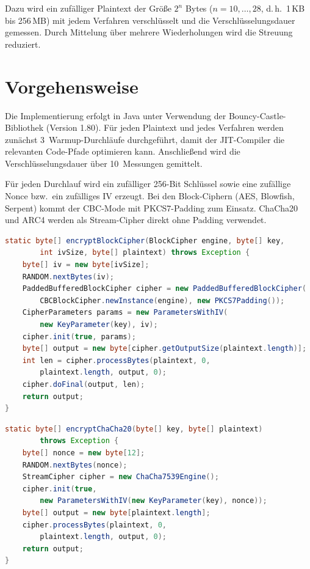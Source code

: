 \documentclass[
    fontsize=12pt,          %
    paper=a4,               %
    numbers=noenddot,       %
    listof=totoc,           %
    listof=entryprefix,     %
    listof=nochaptergap,    %
    bibliography=totoc,     %
    parskip=half,           %
    openany                 %
]{scrbook}
\begin{document}
Dazu wird ein zufälliger Plaintext der Größe $2^n$ Bytes ($n = 10, \ldots, 28$, d.\,h.\ 1\,KB bis 256\,MB) mit jedem Verfahren verschlüsselt und die Verschlüsselungsdauer gemessen.
Durch Mittelung über mehrere Wiederholungen wird die Streuung reduziert.


\section*{Vorgehensweise}

Die Implementierung erfolgt in Java unter Verwendung der Bouncy-Castle-Bibliothek (Version 1.80).
Für jeden Plaintext und jedes Verfahren werden zunächst 3~Warmup-Durchläufe durchgeführt, damit der JIT-Compiler die relevanten Code-Pfade optimieren kann.
Anschließend wird die Verschlüsselungsdauer über 10~Messungen gemittelt.

Für jeden Durchlauf wird ein zufälliger 256-Bit Schlüssel sowie eine zufällige Nonce bzw.\ ein zufälliges IV erzeugt.
Bei den Block-Ciphern (AES, Blowfish, Serpent) kommt der CBC-Mode mit PKCS7-Padding zum Einsatz.
ChaCha20 und ARC4 werden als Stream-Cipher direkt ohne Padding verwendet.

\begin{lstlisting}[language=Java, caption={Verschlüsselung mit einem Block-Cipher (CBC-Mode)}]
static byte[] encryptBlockCipher(BlockCipher engine, byte[] key,
        int ivSize, byte[] plaintext) throws Exception {
    byte[] iv = new byte[ivSize];
    RANDOM.nextBytes(iv);
    PaddedBufferedBlockCipher cipher = new PaddedBufferedBlockCipher(
        CBCBlockCipher.newInstance(engine), new PKCS7Padding());
    CipherParameters params = new ParametersWithIV(
        new KeyParameter(key), iv);
    cipher.init(true, params);
    byte[] output = new byte[cipher.getOutputSize(plaintext.length)];
    int len = cipher.processBytes(plaintext, 0,
        plaintext.length, output, 0);
    cipher.doFinal(output, len);
    return output;
}
\end{lstlisting}

\begin{lstlisting}[language=Java, caption={Verschlüsselung mit ChaCha20}]
static byte[] encryptChaCha20(byte[] key, byte[] plaintext)
        throws Exception {
    byte[] nonce = new byte[12];
    RANDOM.nextBytes(nonce);
    StreamCipher cipher = new ChaCha7539Engine();
    cipher.init(true,
        new ParametersWithIV(new KeyParameter(key), nonce));
    byte[] output = new byte[plaintext.length];
    cipher.processBytes(plaintext, 0,
        plaintext.length, output, 0);
    return output;
}
\end{lstlisting}
\end{document}
